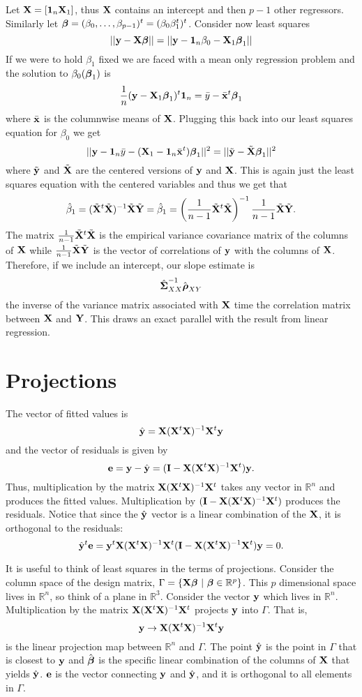 Let $\mathbf{X} = [\mathbf{1}_n \mathbf{X}_1]$, thus $\mathbf{X}$ contains an intercept and then $p-1$ other
regressors. Similarly let $\boldsymbol{\beta} = (\beta_0, \ldots, \beta_{p-1})^t = (\beta_0 \beta_1^t)^t$. Consider now least squares
$$
||\mathbf{y} - \mathbf{X} \boldsymbol{\beta}||
=||\mathbf{y} - \mathbf{1}_n \beta_0 - \mathbf{X}_1 \boldsymbol{\beta}_1||
$$
If we were to hold $\beta_1$ fixed we are faced with a mean only regression
problem and the solution to $\beta_0(\boldsymbol{\beta}_1)$ is 
$$
\frac{1}{n}(\mathbf{y} - \mathbf{X}_1 \boldsymbol{\beta}_1)^t \mathbf{1}_n
= \bar y - \bar {\mathbf{x}}^t \boldsymbol{\beta}_1
$$
where $\bar {\mathbf{x}}$ is the columnwise means of $\mathbf{X}$. Plugging this back into
our least squares equation for $\beta_0$ we get
$$
||\mathbf{y} - \mathbf{1}_n \bar y - (\mathbf{X}_1 - \mathbf{1}_n \bar {\mathbf{x}}^t )\boldsymbol{\beta}_1||^2
= || \tilde {\mathbf{y}} - \tilde {\mathbf{X}}\boldsymbol{\beta}_1||^2
$$
where $\tilde {\mathbf{y}}$ and $\tilde {\mathbf{X}}$ are the centered versions of 
$\mathbf{y}$ and $\mathbf{X}$. This is again just the least squares equation with
the centered variables and thus we get that
$$
\hat \beta_1 = (\tilde {\mathbf{X}}^t \tilde {\mathbf{X}})^{-1} \tilde {\mathbf{X}} \tilde {\mathbf{Y}}
=
\hat \beta_1 = \left(\frac{1}{n-1}\tilde {\mathbf{X}}^t \tilde {\mathbf{X}}\right)^{-1}  
\frac{1}{n-1} \tilde {\mathbf{X}} \tilde {\mathbf{Y}}.
$$
The matrix $\frac{1}{n-1}\tilde {\mathbf{X}}^t \tilde {\mathbf{X}}$ is the empirical 
variance covariance matrix of the columns of $\mathbf{X}$ while 
$\frac{1}{n-1} \tilde {\mathbf{X}} \tilde {\mathbf{Y}}$ is the vector of correlations
of $\mathbf{y}$ with the columns of $\mathbf{X}$. Therefore, if we include an intercept,
our slope estimate is 
$$
\hat {\boldsymbol{\Sigma}}_{XX}^{-1} \hat {\boldsymbol{\rho}}_{XY}
$$
the inverse of the variance matrix associated with $\mathbf{X}$ time the
correlation matrix between $\mathbf{X}$ and $\mathbf{Y}$. This draws an exact
parallel with the result from linear regression.

\section{Projections}
The vector of fitted values is 
$$
\hat {\mathbf{y}} = \mathbf{X} (\mathbf{X}^t \mathbf{X})^{-1} \mathbf{X}^t\mathbf{y} 
$$
and the vector of residuals is given by
$$
\mathbf{e} = \mathbf{y} - \hat {\mathbf{y}} = (\mathbf{I} - \mathbf{X} (\mathbf{X}^t \mathbf{X})^{-1} \mathbf{X}^t) \mathbf{y}.
$$
Thus, multiplication by the matrix $\mathbf{X} (\mathbf{X}^t \mathbf{X})^{-1} \mathbf{X}^t$ takes any vector in
$\mathbb{R}^n$ and produces the fitted values. Multiplication
by $(\mathbf{I} - \mathbf{X} (\mathbf{X}^t \mathbf{X})^{-1} \mathbf{X}^t)$ produces the residuals. Notice that
since the $\hat {\mathbf{y}}$ vector is a linear combination of the $\mathbf{X}$,
it is orthogonal to the residuals:
$$
\hat {\mathbf{y}}^t \mathbf{e} = \mathbf{y} ^ t \mathbf{X} (\mathbf{X}^t \mathbf{X})^{-1} \mathbf{X}^t (\mathbf{I} - \mathbf{X} (\mathbf{X}^t \mathbf{X})^{-1} \mathbf{X}^t)\mathbf{y} = 0.
$$

It is useful to think of least squares in the terms of projections.
Consider the column space of the design matrix, 
$\Gamma = \{ \mathbf{X} \boldsymbol{\beta} ~|~ \boldsymbol{\beta} \in \mathbb{R}^p\}$. This $p$ 
dimensional space lives in $\mathbb{R}^n$, so think of a plane in 
$\mathbb{R}^3$. Consider the vector $\mathbf{y}$ which lives in $\mathbb{R}^n$. Multiplication by the matrix $\mathbf{X} (\mathbf{X}^t \mathbf{X})^{-1} \mathbf{X}^t$ projects $\mathbf{y}$ into $\Gamma$. That
is, 
$$
\mathbf{y} \rightarrow \mathbf{X} (\mathbf{X}^t \mathbf{X})^{-1} \mathbf{X}^t\mathbf{y}
$$
is the linear projection map between $\mathbb{R}^n$ and $\Gamma$.
The point $\hat {\mathbf{y}}$ is the point in $\Gamma$ that is closest to $\mathbf{y}$ and
$\hat {\boldsymbol{\beta}}$ is the specific linear combination of the columns
of $\mathbf{X}$ that yields $\hat {\mathbf{y}}$. 
$\mathbf{e}$ is the vector connecting $\mathbf{y}$ and $\hat {\mathbf{y}}$, and it is
orthogonal to all elements in $\Gamma$.  

